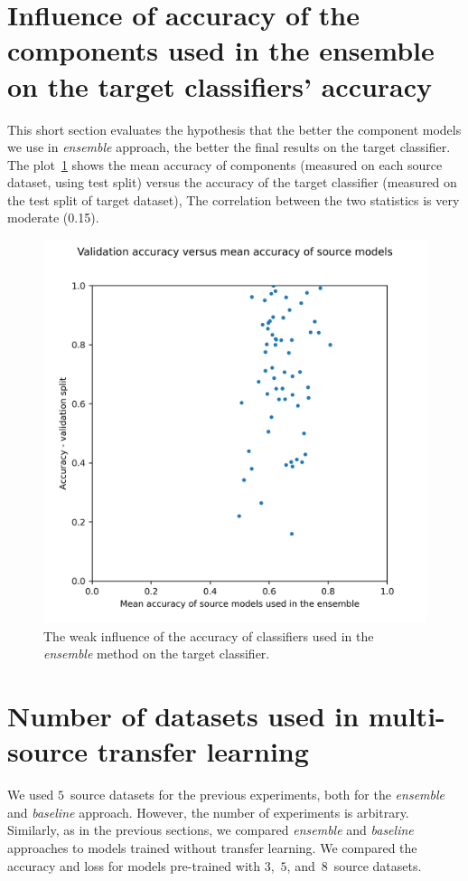 \documentclass[a4paper,11pt,twoside]{report}
\theoremstyle{definition}
\begin{document}
\section{Influence of accuracy of the components used in the ensemble on the target classifiers' accuracy}
This short section evaluates the hypothesis that the better the component models we use in \textit{ensemble} approach, the better the final results on the target classifier. The plot~\ref{fig:acc_source_vs_acc_target} shows the mean accuracy of components (measured on each source dataset, using test split) versus the accuracy of the target classifier (measured on the test split of target dataset), The correlation between the two statistics is very moderate (0.15).
\FloatBarrier
\begin{figure}[h!t]
\centering
\includegraphics[width=14cm]{imgs/ensemble/source_acc_vs_val.png}
\caption{The weak influence of the accuracy of classifiers used in the \textit{ensemble} method on the target classifier.}
\label{fig:acc_source_vs_acc_target}
\end{figure}
\FloatBarrier
\section{Number of datasets used in multi-source transfer learning}
We used $5$~source datasets for the previous experiments, both for the \textit{ensemble} and \textit{baseline} approach. However, the number of experiments is arbitrary. Similarly, as in the previous sections, we compared \textit{ensemble} and \textit{baseline} approaches to models trained without transfer learning. We compared the accuracy and loss for models pre-trained with $3$,~$5$, and~$8$~source datasets.
\end{document}
